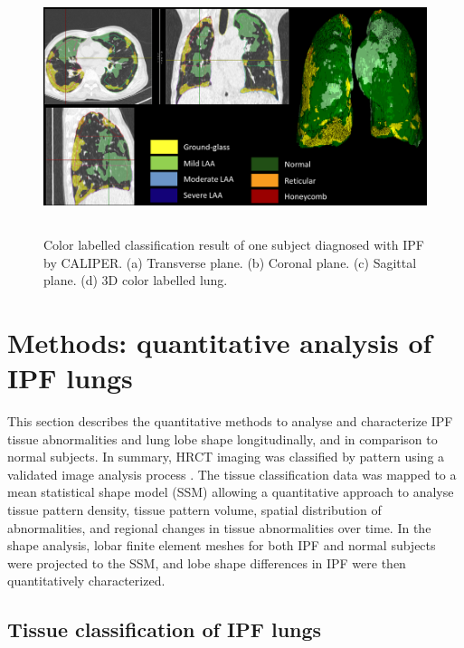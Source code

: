 \begin{figure}[htbp]
  \centering 
  \includegraphics[height=2.9in]{QuantitativeAnalysis/Image/CALIPERResults.png}
  \caption{Color labelled classification result of one subject diagnosed with IPF by CALIPER.  (a) Transverse plane. (b) Coronal plane. (c) Sagittal plane. (d) 3D color labelled lung.}
  \label{fig:CALIPERResults}
\end{figure}


\section{Methods: quantitative analysis of IPF lungs}
This section describes the quantitative methods to analyse and characterize IPF tissue abnormalities and lung lobe shape longitudinally, and in comparison to normal subjects. In summary, HRCT imaging was classified by pattern using a validated image analysis process \citep{maldonado2013automated,bartholmai2013quantitative,raghunath2014quantitative}. The tissue classification data was mapped to a mean statistical shape model (SSM) allowing a quantitative approach to analyse tissue pattern density, tissue pattern volume, spatial distribution of abnormalities, and regional changes in tissue abnormalities over time. In the shape analysis, lobar finite element meshes for both IPF and normal subjects were projected to the SSM, and lobe shape differences in IPF were then quantitatively characterized.

\subsection{Tissue classification of IPF lungs}

